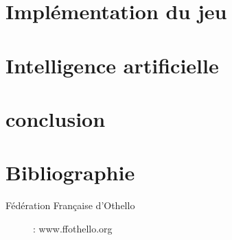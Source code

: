 \documentclass[10pt,a4paper]{report}
\begin{document}
\part{Implémentation du jeu}

\part{Intelligence artificielle}

\part{conclusion}

\part{Bibliographie}
\begin{description}
\item[Fédération Française d'Othello] : www.ffothello.org
\end{description}
\end{document}
